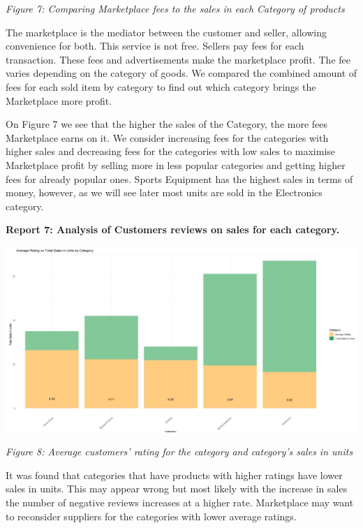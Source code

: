 \documentclass[
  letterpaper,
  DIV=11,
  numbers=noendperiod]{scrartcl}
\begin{document}
\emph{Figure 7: Comparing Marketplace fees to the sales in each Category
of products}

The marketplace is the mediator between the customer and seller,
allowing convenience for both. This service is not free. Sellers pay
fees for each transaction. These fees and advertisements make the
marketplace profit. The fee varies depending on the category of goods.
We compared the combined amount of fees for each sold item by category
to find out which category brings the Marketplace more profit.

On Figure 7 we see that the higher the sales of the Category, the more
fees Marketplace earns on it. We consider increasing fees for the
categories with higher sales and decreasing fees for the categories with
low sales to maximise Marketplace profit by selling more in less popular
categories and getting higher fees for already popular ones. Sports
Equipment has the highest sales in terms of money, however, as we will
see later most units are sold in the Electronics category.

\textbf{Report 7: Analysis of Customers reviews on sales for each
category.}

\includegraphics[width=8.65625in,height=\textheight]{images/Figure 6.jpeg}

\emph{Figure 8: Average customers' rating for the category and
category's sales in units}

It was found that categories that have products with higher ratings have
lower sales in units. This may appear wrong but most likely with the
increase in sales the number of negative reviews increases at a higher
rate. Marketplace may want to reconsider suppliers for the categories
with lower average ratings.
\end{document}
